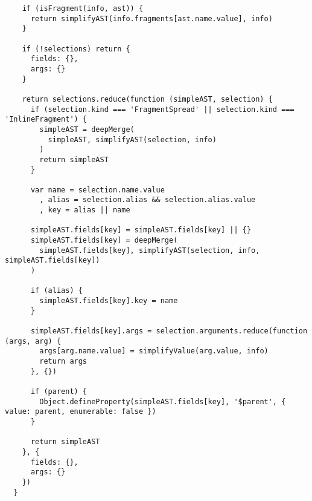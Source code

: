 \begin{verbatim}
    if (isFragment(info, ast)) {
      return simplifyAST(info.fragments[ast.name.value], info)
    }

    if (!selections) return {
      fields: {},
      args: {}
    }

    return selections.reduce(function (simpleAST, selection) {
      if (selection.kind === 'FragmentSpread' || selection.kind === 'InlineFragment') {
        simpleAST = deepMerge(
          simpleAST, simplifyAST(selection, info)
        )
        return simpleAST
      }

      var name = selection.name.value
        , alias = selection.alias && selection.alias.value
        , key = alias || name

      simpleAST.fields[key] = simpleAST.fields[key] || {}
      simpleAST.fields[key] = deepMerge(
        simpleAST.fields[key], simplifyAST(selection, info, simpleAST.fields[key])
      )

      if (alias) {
        simpleAST.fields[key].key = name
      }

      simpleAST.fields[key].args = selection.arguments.reduce(function (args, arg) {
        args[arg.name.value] = simplifyValue(arg.value, info)
        return args
      }, {})

      if (parent) {
        Object.defineProperty(simpleAST.fields[key], '$parent', { value: parent, enumerable: false })
      }

      return simpleAST
    }, {
      fields: {},
      args: {}
    })
  }
\end{verbatim}
